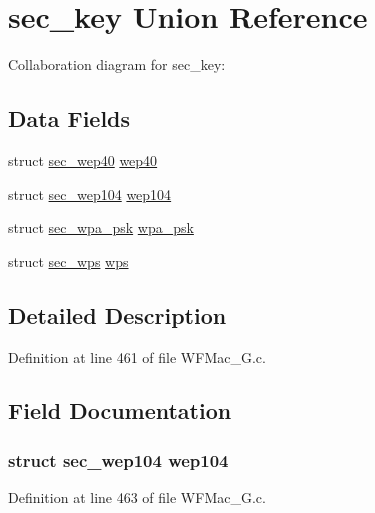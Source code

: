 \hypertarget{unionsec__key}{}\section{sec\+\_\+key Union Reference}
\label{unionsec__key}


Collaboration diagram for sec\+\_\+key\+:
\subsection*{Data Fields}
\begin{DoxyCompactItemize}
\item 
struct \hyperlink{structsec__wep40}{sec\+\_\+wep40} \hyperlink{unionsec__key_a5196592ec5195d9d371aca694d2c4d80}{wep40}
\item 
struct \hyperlink{structsec__wep104}{sec\+\_\+wep104} \hyperlink{unionsec__key_a2f79d4584fe6470b4ad77a52ddd380de}{wep104}
\item 
struct \hyperlink{structsec__wpa__psk}{sec\+\_\+wpa\+\_\+psk} \hyperlink{unionsec__key_a2ccb9e057aaf3c0850c9587eaa8b700e}{wpa\+\_\+psk}
\item 
struct \hyperlink{structsec__wps}{sec\+\_\+wps} \hyperlink{unionsec__key_a29ddfcaba6443459a450b55b606d7e2a}{wps}
\end{DoxyCompactItemize}


\subsection{Detailed Description}


Definition at line 461 of file W\+F\+Mac\+\_\+G.\+c.



\subsection{Field Documentation}
\hypertarget{unionsec__key_a2f79d4584fe6470b4ad77a52ddd380de}{}
\subsubsection[{wep104}]{\setlength{\rightskip}{0pt plus 5cm}struct {\bf sec\+\_\+wep104} wep104}\label{unionsec__key_a2f79d4584fe6470b4ad77a52ddd380de}


Definition at line 463 of file W\+F\+Mac\+\_\+G.\+c.

